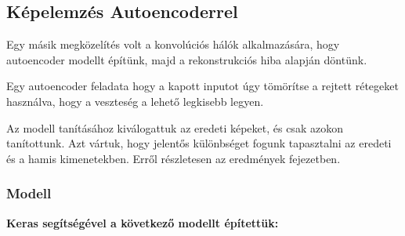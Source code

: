 %
%
%
%
%
%
%
%
%





\subsection{Képelemzés Autoencoderrel}


Egy másik megközelítés volt a konvolúciós hálók alkalmazására, hogy autoencoder modellt 
építünk, majd a rekonstrukciós hiba alapján döntünk.

Egy autoencoder feladata hogy a kapott inputot úgy tömörítse a rejtett rétegeket
használva, hogy a veszteség a lehető legkisebb legyen.

Az modell tanításához kiválogattuk az eredeti képeket, és csak azokon tanítottunk.
Azt vártuk, hogy jelentős különbséget fogunk tapasztalni az eredeti és a hamis 
kimenetekben. Erről részletesen az eredmények fejezetben.


\subsubsection{Modell}
\noindent
\textbf{Keras segítségével a következő modellt építettük:}


